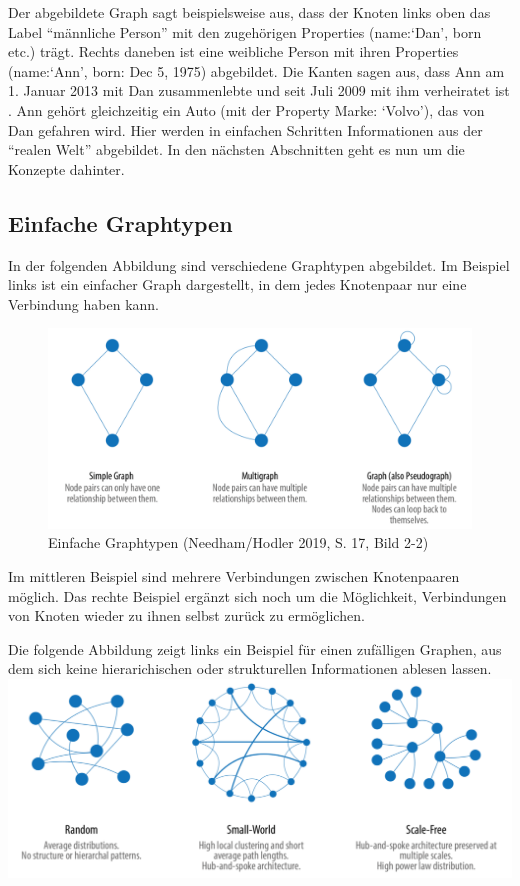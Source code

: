 \documentclass[ngerman,]{scrreprt}
\begin{document}
Der abgebildete Graph sagt beispielsweise aus, dass der Knoten links oben das Label ``männliche Person'' mit den zugehörigen Properties (name:`Dan', born etc.) trägt. Rechts daneben ist eine weibliche Person mit ihren Properties (name:`Ann', born: Dec 5, 1975) abgebildet. Die Kanten sagen aus, dass Ann am 1. Januar 2013 mit Dan zusammenlebte und seit Juli 2009 mit ihm verheiratet ist . Ann gehört gleichzeitig ein Auto (mit der Property Marke: `Volvo'), das von Dan gefahren wird. Hier werden in einfachen Schritten Informationen aus der ``realen Welt'' abgebildet. In den nächsten Abschnitten geht es nun um die Konzepte dahinter.

\hypertarget{einfache-graphtypen}{%
\subsection{Einfache Graphtypen}\label{einfache-graphtypen}}

In der folgenden Abbildung sind verschiedene Graphtypen abgebildet. Im Beispiel links ist ein einfacher Graph dargestellt, in dem jedes Knotenpaar nur eine Verbindung haben kann.

\begin{figure}
\centering
\includegraphics{Bilder/Graph-Algorithms/17-2-2-TypesOfGraphs.png}
\caption{Einfache Graphtypen (Needham/Hodler 2019, S. 17, Bild 2-2)}
\end{figure}

Im mittleren Beispiel sind mehrere Verbindungen zwischen Knotenpaaren möglich. Das rechte Beispiel ergänzt sich noch um die Möglichkeit, Verbindungen von Knoten wieder zu ihnen selbst zurück zu ermöglichen.

Die folgende Abbildung zeigt links ein Beispiel für einen zufälligen Graphen, aus dem sich keine hierarichischen oder strukturellen Informationen ablesen lassen. \includegraphics{Bilder/Graph-Algorithms/17-2-3-RandomSmallWorldScaleFree.png}
\end{document}

